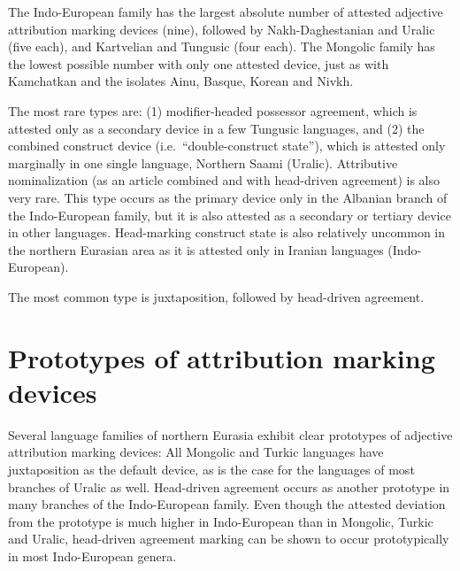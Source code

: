 The Indo-European family has the largest absolute number of attested adjective attribution marking devices (nine), followed by Nakh-Daghestanian and Uralic (five each), and Kartvelian and Tungusic (four each). The Mongolic family has the lowest possible number with only one attested device, just as with Kamchatkan and the isolates Ainu, Basque, Korean and Nivkh.

The most rare types are:  (1) modifier-headed possessor agreement, which is attested only as a secondary device in a few Tungusic languages, and (2) the combined construct device (i.e.~“double-construct state”), which is attested only marginally in one single language, Northern Saami (Uralic). Attributive nominalization (as an article combined and with head-driven agreement) is also very rare. This type occurs as the primary device only in the Albanian branch of the Indo-European family, but it is also attested as a secondary or tertiary device in other languages. Head-marking construct state is also relatively uncommon in the northern Eurasian area as it is attested only in Iranian languages (Indo-European).

The most common type is juxtaposition, followed by head-driven agreement.

\section{Prototypes of attribution marking devices}
Several language families of northern Eurasia exhibit clear prototypes of adjective attribution marking devices: All Mongolic and Turkic languages have juxtaposition as the default device, as is the case for the languages of most branches of Uralic as well. Head-driven agreement occurs as another prototype in many branches of the Indo-European family. Even though the attested deviation from the prototype is much higher in Indo-European than in Mongolic, Turkic and Uralic, head-driven agreement marking can be shown to occur prototypically in most Indo-European genera.

